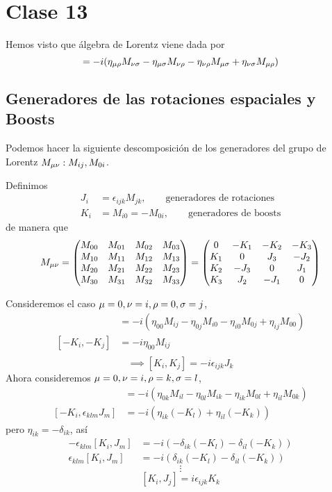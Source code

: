 \section{Clase 13}
Hemos visto que  álgebra de Lorentz viene dada por
\begin{equation}
  [M_{\m\n},M_{\rho\s }]=-i(\eta_{\m\rho}M_{\n\s }-\eta_{\m\s }M_{\n\rho }-\eta_{\n\rho}M_{\m\s }+\eta_{\n\s }M_{\m\rho})
\end{equation}

\subsection{Generadores de las rotaciones espaciales y Boosts}
Podemos hacer la siguiente descomposición de los generadores del grupo de Lorentz $M_{\mu\nu }:M_{ij},M_{0i}$.

Definimos 
\begin{align}
  J_i&=\epsilon_{ijk}M_{jk},\qquad \text{generadores de rotaciones}\\
  K_i&=M_{i0}=-M_{0i},\qquad \text{generadores de boosts}
\end{align}
de manera que
\begin{equation}
  M_{\m\n }=\mqty(M_{00}&M_{01}&M_{02}&M_{03}\\
  M_{10}&M_{11}&M_{12}&M_{13}\\
  M_{20}&M_{21}&M_{22}&M_{23}\\
  M_{30}&M_{31}&M_{32}&M_{33})=
  \mqty(0&-K_1&-K_2&-K_3\\
  K_1&0&J_3&-J_2\\
  K_2&-J_3&0&J_1\\
  K_3&J_2&-J_1&0)
\end{equation}

Consideremos el caso $\mu=0,\nu=i, \rho=0,\sigma=j$,
\begin{align}
  [M_{0i},M_{0j}]&=-i(\eta_{00}M_{ij }-\eta_{0j }M_{i0 }-\eta_{i0}M_{0j}+\eta_{ij }M_{00})\\
  [-K_{i},-K_j]&=-i\eta_{00}M_{ij}\\
\end{align}
\begin{equation}
\implies \boxed{   [K_{i},K_j]=-i\epsilon_{ijk}J_k}
\end{equation}
Ahora consideremos $\mu=0,\nu=i,\rho=k,\sigma=l$,
\begin{align}
  [M_{0i},M_{kl }]&=-i(\eta_{0k}M_{il}-\eta_{0l }M_{ik }-\eta_{ik}M_{0l }+\eta_{il }M_{0k})\\
  [-K_i,\epsilon_{klm}J_m]&=-i(\eta_{ik}(-K_l)+\eta_{il}(-K_k))
\end{align}
pero $\eta_{ik}=-\delta_{ik}$, así
\begin{align}
  -\epsilon_{klm}[K_i,J_m]&=-i(-\delta_{ik}(-K_l)-\delta_{il}(-K_k))\\
  \epsilon_{klm}[K_i,J_m]&=-i(\delta_{ik}(-K_l)-\delta_{il}(-K_k))
\end{align}
\begin{equation}
  \vdots 
\end{equation}
\begin{equation}
	\boxed{ [K_i,J_j]=i\epsilon_{ijk}K_k}
\end{equation}

